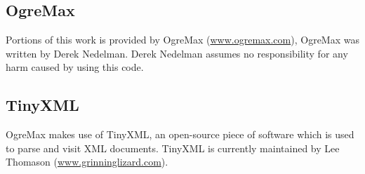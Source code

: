     \subsection{OgreMax}
        
        Portions of this work is provided by OgreMax (\href{http://www.ogremax.com}{www.ogremax.com}), OgreMax was written by Derek Nedelman. Derek Nedelman assumes no responsibility for any harm caused by using this code.
        
    \subsection{TinyXML}
    
        OgreMax makes use of TinyXML, an open-source piece of software which is used to parse and visit XML documents. TinyXML is currently maintained by Lee Thomason (\href{http://www.grinninglizard.com}{www.grinninglizard.com}).
    
